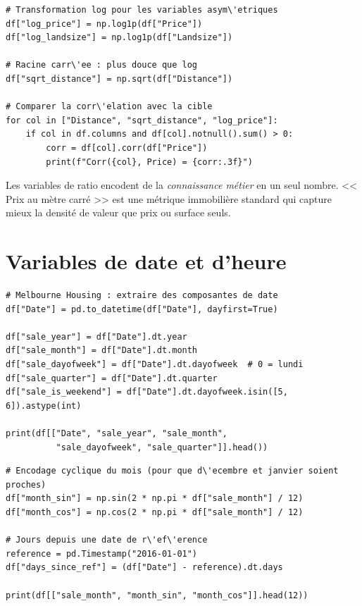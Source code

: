 \begin{verbatim}
# Transformation log pour les variables asym\'etriques
df["log_price"] = np.log1p(df["Price"])
df["log_landsize"] = np.log1p(df["Landsize"])

# Racine carr\'ee : plus douce que log
df["sqrt_distance"] = np.sqrt(df["Distance"])

# Comparer la corr\'elation avec la cible
for col in ["Distance", "sqrt_distance", "log_price"]:
    if col in df.columns and df[col].notnull().sum() > 0:
        corr = df[col].corr(df["Price"])
        print(f"Corr({col}, Price) = {corr:.3f}")
\end{verbatim}

\begin{preprocesstip}
Les variables de ratio encodent de la \emph{connaissance m\'etier} en un seul nombre. << Prix au m\`etre carr\'e >> est une m\'etrique immobili\`ere standard qui capture mieux la densit\'e de valeur que prix ou surface seuls.
\end{preprocesstip}

\section{Variables de date et d'heure}

\begin{verbatim}
# Melbourne Housing : extraire des composantes de date
df["Date"] = pd.to_datetime(df["Date"], dayfirst=True)

df["sale_year"] = df["Date"].dt.year
df["sale_month"] = df["Date"].dt.month
df["sale_dayofweek"] = df["Date"].dt.dayofweek  # 0 = lundi
df["sale_quarter"] = df["Date"].dt.quarter
df["sale_is_weekend"] = df["Date"].dt.dayofweek.isin([5, 6]).astype(int)

print(df[["Date", "sale_year", "sale_month",
          "sale_dayofweek", "sale_quarter"]].head())
\end{verbatim}

\begin{verbatim}
# Encodage cyclique du mois (pour que d\'ecembre et janvier soient proches)
df["month_sin"] = np.sin(2 * np.pi * df["sale_month"] / 12)
df["month_cos"] = np.cos(2 * np.pi * df["sale_month"] / 12)

# Jours depuis une date de r\'ef\'erence
reference = pd.Timestamp("2016-01-01")
df["days_since_ref"] = (df["Date"] - reference).dt.days

print(df[["sale_month", "month_sin", "month_cos"]].head(12))
\end{verbatim}

